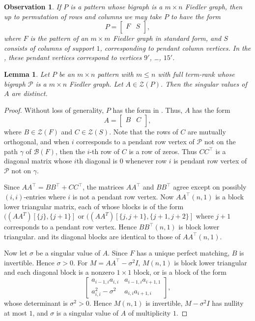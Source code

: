 \documentclass[preprint,12pt]{elsarticle}
\newcommand{\trans  }{^\top}
\newtheorem{lemma}[theorem]{Lemma}
\newtheorem{observation}[theorem]{Observation}
\begin{document}
\begin{observation}
\label{fform}
\rm
    If $P$ is a pattern whose bigraph is a $m\times n$ Fiedler graph, then up to permutation of rows and columns we may take $P$ to have the form 
    \[ P = 
    \left[ 
    \begin{array}{c|c}
        F & S  \\
    \end{array}
    \right],
    \]
    where $F$ is the pattern of an $m\times m$ Fiedler graph in standard form,  and $S$ consists of columns of support $1$, corresponding to pendant column vertices. In the , these pendant vertices correspond to  vertices $9'$, \ldots, $15'$.
\end{observation}
\begin{lemma}
\label{caterpillarsdistinct}
Let $P$ be an $m \times n$ pattern with $m \leq n$ with full term-rank whose bigraph $\mathcal{P}$ is a $m\times n$ Fiedler graph. Let $A \in \mathcal{Z}(P)$. Then the singular values of $A$ are distinct. 
\end{lemma}
\begin{proof}
Without loss of generality, $P$ has the form in .
Thus, $A$ has the form  
\[ A = 
    \left[ 
    \begin{array}{c|c}
        B & C  \\
    \end{array}
    \right],
    \]
where $B \in \mathcal{Z}(F)$ and $C\in \mathcal{Z}(S)$.  
Note that the rows of $C$ are mutually orthogonal, and  when 
$i$ corresponds
to a pendant row vertex of $\mathcal{P}$ not on the path $\gamma$ of $\mathcal{B}(F)$, 
then the $i$-th row of $C$ is a row of zeros. Thus $CC\trans$ is a diagonal matrix whose $i$th diagonal 
is $0$ whenever row $i$ is pendant row vertex of $\mathcal{P}$ not on $\gamma$. 

Since $ AA\trans=  
    BB\trans + CC\trans$, the matrices
    $AA\trans$ and $BB\trans$ agree except on possibly $(i,i)$-entries
    where $i$ is not a pendant row vertex.  Now $AA\trans(n,1)$
    is a block lower triangular matrix, each of whose blocks is of the form 
    $((AA^T)[\{j\},\{j+1\}]$  or $((AA^T)[\{j,j+1\}, \{j+1,j+2\}]$ where $j+1$ corresponds to a pendant row vertex.  Hence $BB\trans(n,1)$ 
    is block lower triangular. and its diagonal blocks are identical to those
    of $AA\trans(n,1)$. 
    
    Now let $\sigma$ be a singular value of $A$.  
    Since $F$ has a unique perfect matching, $B$ is invertible. Hence $\sigma>0$. For  $M=AA\trans -\sigma^2 I$,
    $M(n,1)$ is block lower triangular and each diagonal block is a nonzero 
    $1\times 1$ block, or is a block of the form
    \[ 
    \begin{bmatrix}
        a_{i-1,i}a_{i,i}  & a_{i-1,i}a_{i+1,1} \\
        a_{i,i}^2 -\sigma^2 & a_{i,i}a_{i+1,i}
    \end{bmatrix},
    \]
    whose determinant is $\sigma^2>0$.
    Hence $M(n,1)$ is invertible, $M-\sigma^2 I$  has nullity at most $1$, 
    and $\sigma$ is a singular value of $A$ of multiplicity $1$. 
\end{proof}
\end{document}
